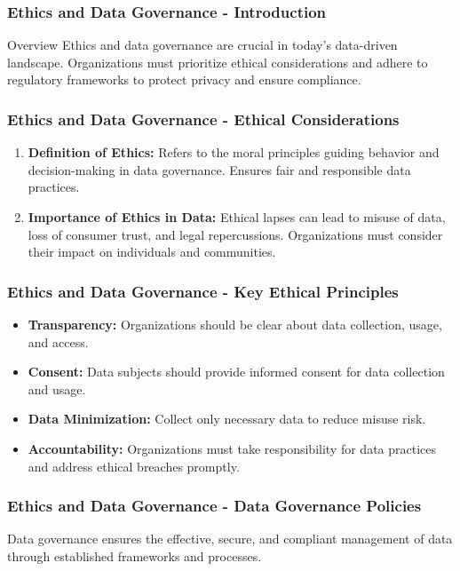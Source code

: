 \documentclass{beamer}
\begin{document}
\begin{frame}[fragile]
    \frametitle{Ethics and Data Governance - Introduction}
    \begin{block}{Overview}
        Ethics and data governance are crucial in today’s data-driven landscape. 
        Organizations must prioritize ethical considerations and adhere to regulatory frameworks to protect privacy and ensure compliance.
    \end{block}
\end{frame}

\begin{frame}[fragile]
    \frametitle{Ethics and Data Governance - Ethical Considerations}
    \begin{enumerate}
        \item \textbf{Definition of Ethics:} 
            Refers to the moral principles guiding behavior and decision-making in data governance. 
            Ensures fair and responsible data practices.
        
        \item \textbf{Importance of Ethics in Data:} 
            Ethical lapses can lead to misuse of data, loss of consumer trust, and legal repercussions. 
            Organizations must consider their impact on individuals and communities.
    \end{enumerate}
\end{frame}

\begin{frame}[fragile]
    \frametitle{Ethics and Data Governance - Key Ethical Principles}
    \begin{itemize}
        \item \textbf{Transparency:} Organizations should be clear about data collection, usage, and access.
        
        \item \textbf{Consent:} Data subjects should provide informed consent for data collection and usage.
        
        \item \textbf{Data Minimization:} Collect only necessary data to reduce misuse risk.
        
        \item \textbf{Accountability:} Organizations must take responsibility for data practices and address ethical breaches promptly.
    \end{itemize}
\end{frame}

\begin{frame}[fragile]
    \frametitle{Ethics and Data Governance - Data Governance Policies}
    Data governance ensures the effective, secure, and compliant management of data through established frameworks and processes.
\end{frame}
\end{document}
